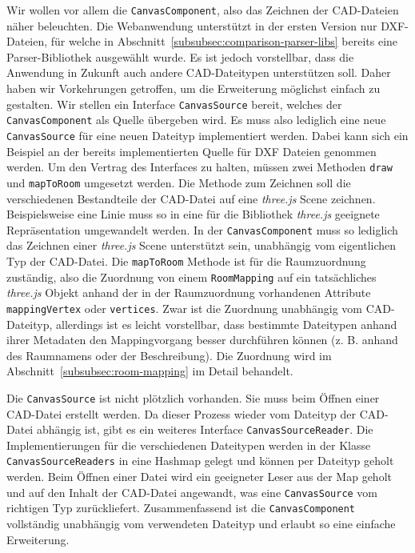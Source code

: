 Wir wollen vor allem die \texttt{CanvasComponent}, also das Zeichnen der CAD-Dateien näher beleuchten.
Die Webanwendung unterstützt in der ersten Version nur DXF-Dateien, für welche in Abschnitt~\ref{subsubsec:comparison-parser-libs} bereits eine Parser-Bibliothek ausgewählt wurde.
Es ist jedoch vorstellbar, dass die Anwendung in Zukunft auch andere CAD-Dateitypen unterstützen soll.
Daher haben wir Vorkehrungen getroffen, um die Erweiterung möglichst einfach zu gestalten.
Wir stellen ein Interface \texttt{CanvasSource} bereit, welches der \texttt{CanvasComponent} als Quelle übergeben wird.
Es muss also lediglich eine neue \texttt{CanvasSource} für eine neuen Dateityp implementiert werden.
Dabei kann sich ein Beispiel an der bereits implementierten Quelle für DXF Dateien genommen werden.
Um den Vertrag des Interfaces zu halten, müssen zwei Methoden \texttt{draw} und \texttt{mapToRoom} umgesetzt werden.
Die Methode zum Zeichnen soll die verschiedenen Bestandteile der CAD-Datei auf eine \textit{three.js} Scene zeichnen.
Beispielsweise eine Linie muss so in eine für die Bibliothek \textit{three.js} geeignete Repräsentation umgewandelt werden.
In der \texttt{CanvasComponent} muss so lediglich das Zeichnen einer \textit{three.js} Scene unterstützt sein, unabhängig vom eigentlichen Typ der CAD-Datei.
Die \texttt{mapToRoom} Methode ist für die Raumzuordnung zuständig, also die Zuordnung von einem \texttt{RoomMapping} auf ein tatsächliches \textit{three.js} Objekt anhand der in der Raumzuordnung vorhandenen Attribute \texttt{mappingVertex} oder \texttt{vertices}.
Zwar ist die Zuordnung unabhängig vom CAD-Dateityp, allerdings ist es leicht vorstellbar, dass bestimmte Dateitypen anhand ihrer Metadaten den Mappingvorgang besser durchführen können (z. B. anhand des Raumnamens oder der Beschreibung).
Die Zuordnung wird im Abschnitt~\ref{subsubsec:room-mapping} im Detail behandelt.

Die \texttt{CanvasSource} ist nicht plötzlich vorhanden.
Sie muss beim Öffnen einer CAD-Datei erstellt werden.
Da dieser Prozess wieder vom Dateityp der CAD-Datei abhängig ist, gibt es ein weiteres Interface \texttt{CanvasSourceReader}.
Die Implementierungen für die verschiedenen Dateitypen werden in der Klasse \texttt{CanvasSourceReaders} in eine Hashmap gelegt und können per Dateityp geholt werden.
Beim Öffnen einer Datei wird ein geeigneter \glqq{}Leser\grqq{} aus der Map geholt und auf den Inhalt der CAD-Datei angewandt, was eine \texttt{CanvasSource} vom richtigen Typ zurückliefert.
Zusammenfassend ist die \texttt{CanvasComponent} vollständig unabhängig vom verwendeten Dateityp und erlaubt so eine einfache Erweiterung.

